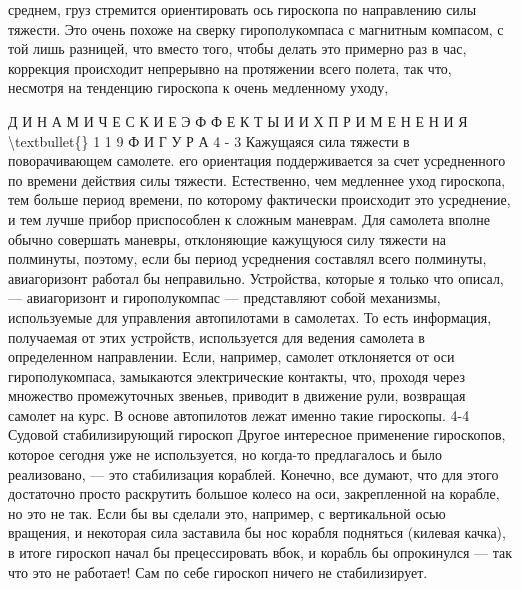 \documentclass[10pt,oneside]{article}
\begin{document}
среднем, груз стремится ориентировать ось гироскопа по направлению силы тяжести. Это очень похоже на сверку гирополукомпаса с магнитным компасом, с той лишь разницей, что вместо того, чтобы делать это примерно раз в час, коррекция происходит непрерывно на протяжении всего полета, так что, несмотря на тенденцию гироскопа к очень медленному уходу,\par

Д И Н А М И Ч Е С К И Е  Э Ф Ф Е К Т Ы  И  И Х  П Р И М Е Н Е Н И Я \textbackslash{}textbullet\{\} 1 1 9 Ф И Г У Р А  4 - 3 Кажущаяся сила тяжести в поворачивающем самолете. его ориентация поддерживается за счет усредненного по времени действия силы тяжести. Естественно, чем медленнее уход гироскопа, тем больше период времени, по которому фактически происходит это усреднение, и тем лучше прибор приспособлен к сложным маневрам. Для самолета вполне обычно совершать маневры, отклоняющие кажущуюся силу тяжести на полминуты, поэтому, если бы период усреднения составлял всего полминуты, авиагоризонт работал бы неправильно. Устройства, которые я только что описал, --- авиагоризонт и гирополукомпас --- представляют собой механизмы, используемые для управления автопилотами в самолетах. То есть информация, получаемая от этих устройств, используется для ведения самолета в определенном направлении. Если, например, самолет отклоняется от оси гирополукомпаса, замыкаются электрические контакты, что, проходя через множество промежуточных звеньев, приводит в движение рули, возвращая самолет на курс. В основе автопилотов лежат именно такие гироскопы. 4-4 Судовой стабилизирующий гироскоп Другое интересное применение гироскопов, которое сегодня уже не используется, но когда-то предлагалось и было реализовано, --- это стабилизация кораблей. Конечно, все думают, что для этого достаточно просто раскрутить большое колесо на оси, закрепленной на корабле, но это не так. Если бы вы сделали это, например, с вертикальной осью вращения, и некоторая сила заставила бы нос корабля подняться (килевая качка), в итоге гироскоп начал бы прецессировать вбок, и корабль бы опрокинулся --- так что это не работает! Сам по себе гироскоп ничего не стабилизирует.\par
\end{document}
